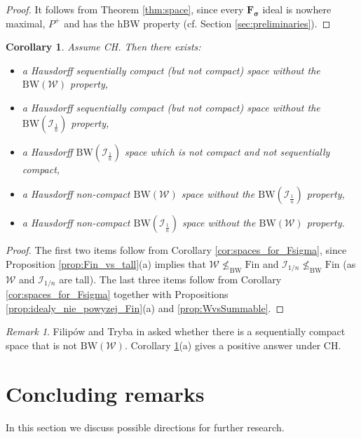 \documentclass{amsart}
\theoremstyle{plain}
\newtheorem{corollary}[theorem]{Corollary}
\theoremstyle{definition}
\theoremstyle{remark}
\newtheorem{remark}[theorem]{Remark}
\newcommand{\cI}{\mathcal{I}}
\newcommand{\I}{\cI}
\newcommand{\Fin}{\mathrm{Fin}}
\newcommand{\BW}{\mathrm{BW}}
\newcommand{\hBW}{\mathrm{hBW}}
\begin{document}
\begin{proof}
It follows from Theorem \ref{thm:space}, since every $\mathbf{F_\sigma}$ ideal is nowhere maximal, $P^+$ and has the $\hBW$ property (cf. Section \ref{sec:preliminaries}).
\end{proof}

\begin{corollary}\label{cor: spaces}
Assume CH. Then there exists:
\begin{itemize}
 \item[(a)] a Hausdorff sequentially compact (but not compact) space without the $\BW(\mathcal{W})$ property,
 \item[(b)] a Hausdorff sequentially compact (but not compact) space without the $\BW(\I_\frac{1}{n})$ property,
 \item[(c)] a Hausdorff $\BW(\I_\frac{1}{n})$ space which is not compact and not sequentially compact,
 \item[(d)] a Hausdorff non-compact $\BW(\mathcal{W})$ space without the $\BW(\I_\frac{1}{n})$ property,
 \item[(e)] a Hausdorff non-compact $\BW(\I_\frac{1}{n})$ space without the $\BW(\mathcal{W})$ property.
\end{itemize}    
\end{corollary}

\begin{proof}
The first two items follow from Corollary \ref{cor:spaces_for_Fsigma}, since Proposition \ref{prop:Fin_vs_tall}(a) implies that $\mathcal{W}\not\leq_\BW\Fin$ and $\I_{1/n}\not\leq_\BW\Fin$ (as $\mathcal{W}$ and $\I_{1/n}$ are tall). The last three items follow from Corollary \ref{cor:spaces_for_Fsigma} together with Propositions \ref{prop:idealy_nie_powyzej_Fin}(a) and \ref{prop:WvsSummable}. 
\end{proof}


\begin{remark}
Filip\'{o}w and Tryba in \cite[Question 2]{FT} asked whether there is a sequentially compact space that is not $\BW(\mathcal{W})$. Corollary \ref{cor: spaces}(a) gives a positive answer under CH.
\end{remark}

\section{Concluding remarks}
\label{sec:last}

In this section we discuss possible directions for further research.
\end{document}
